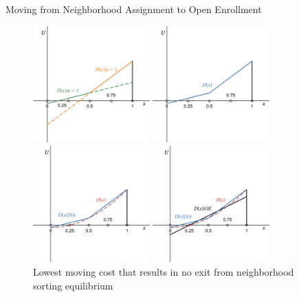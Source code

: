 \documentclass[notes,11pt, aspectratio=169]{beamer}
\begin{document}
\begin{frame}{Moving from Neighborhood Assignment to Open Enrollment}
\begin{figure}
    \begin{overprint}
    \centering\includegraphics[width=0.4\textwidth]{figures/neighborhood_1.png}
    \caption{Symmetric neighborhood sorting equilibrium. Utility for marginal household of type $x$}
    \centering\includegraphics[width=0.4\textwidth]{figures/neighborhood_2.png}
    \caption{Level of utility in symmetric neighborhood sorting equilibrium}
    \centering\includegraphics[width=0.4\textwidth]{figures/neighborhood.png}
    \caption{Lowest moving cost that results in no exit from neighborhood sorting equilibrium}
    \centering\includegraphics[width=0.4\textwidth]{figures/all.png}

\end{overprint}
\end{figure}
\end{frame}
\end{document}
